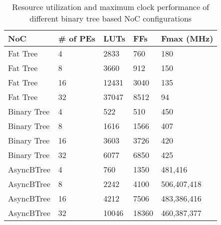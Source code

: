 \begin{table}[!b]
  \centering
  \caption{Resource utilization and maximum clock performance of different binary tree based NoC configurations} 
  \begin{tabular}{l|l|l|l|l}
      \toprule
      NoC & \# of PEs & LUTs & FFs & Fmax (MHz) \\
      \midrule
      \midrule
	  Fat Tree & 4      & 2833 & 760 & 180   \\
      Fat Tree & 8      & 3660 & 912 & 150   \\
      Fat Tree & 16     & 12431 & 3040 & 135 \\
      Fat Tree & 32     & 37047 & 8512 & 94  \\    
      \midrule
      Binary Tree  &  4         &  522 & 510 & 450\\
      Binary Tree  &  8         &  1616 & 1566 & 407\\
      Binary Tree  &  16        &  3603 & 3726 & 420\\
      Binary Tree  &  32        &  6077 & 6850 & 425\\
	  \midrule
      AsyncBTree & 4         & 760  & 1350 & 481,416\\
      AsyncBTree & 8         & 2242 & 4100 & 506,407,418\\
      AsyncBTree & 16        & 4212 & 7506 & 483,386,416 \\
      AsyncBTree & 32        & 10046 & 18360 & 460,387,377\\
      \bottomrule
    \end{tabular}
	\label{table:systemResourceConsumption}
\end{table}